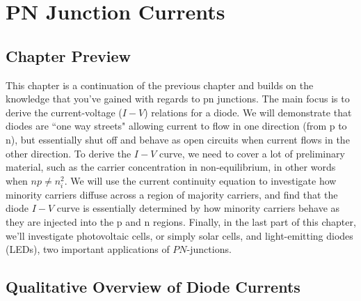\chapter{PN Junction Currents}
\label{ch:ch06_pn_currents}
\graphicspath{{./figs_pn_currents/}}
\section{Chapter Preview}
This chapter is a continuation of the previous chapter and builds on the knowledge that you've gained with regards to pn junctions.  The main focus is to derive the current-voltage ($I-V$) relations  for a diode.  We will demonstrate that diodes are ``one way streets" allowing current to flow in one direction (from p to n), but essentially shut off and behave as open circuits when current flows in the other direction.  To derive the $I-V$ curve, we need to cover a lot of preliminary material, such as the carrier concentration in non-equilibrium, in other words when $n p \neq n_i^2$.  We will use the current continuity equation to investigate how minority carriers diffuse across a region of majority carriers, and find that the diode $I-V$ curve is essentially determined by how minority carriers behave as they are injected into the p and n regions.  Finally, in the last part of this chapter, we'll investigate photovoltaic cells, or simply solar cells, and light-emitting diodes (LEDs), two important applications of $PN$-junctions.
\section{Qualitative Overview of Diode Currents}
